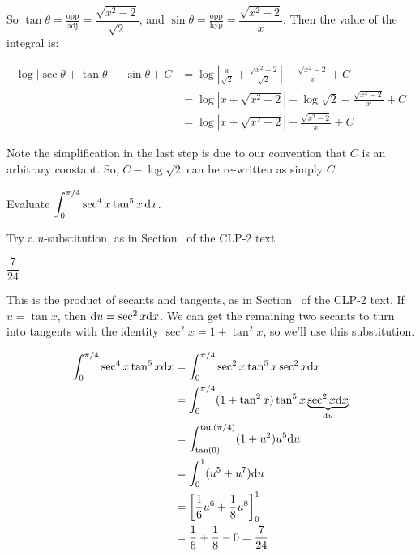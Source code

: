 \begin{solution}
\begin{center}
\end{center}

So $\tan \theta = \frac{\mbox{opp}}{\mbox{adj}}=\dfrac{\sqrt{x^2-2}}{\sqrt{2}}$, and $\sin\theta = \frac{\mbox{opp}}{\mbox{hyp}}=\dfrac{\sqrt{x^2-2}}{x}$. Then the value of the integral is:

\begin{align*}
\log|\sec\theta + \tan\theta|-\sin\theta +C
&={ \log \left|
\frac{x}{\sqrt{2}}+\frac{\sqrt{x^2-2}}{\sqrt{2}}
\right|-\frac{\sqrt{x^2-2}}{x}+C}\\
&={ \log \left| x+{\sqrt{x^2-2}}
\right|-\log\sqrt{2}-\frac{\sqrt{x^2-2}}{x}+C}\\
&= \log \left| x+{\sqrt{x^2-2}}
\right|-\frac{\sqrt{x^2-2}}{x}+C
\end{align*}

Note the simplification in the last step is due to our convention that $C$ is an arbitrary constant. So, $C-\log\sqrt{2}$ can be re-written as simply $C$.
\end{solution}




\begin{question} Evaluate
$\displaystyle\int_0^{\pi/4} \sec^4x\tan^5x\,\mathrm{d}x$.
\end{question}

\begin{hint}
Try a $u$-substitution, as in Section~ of the CLP-2 text%
\end{hint}

\begin{answer}
$\dfrac{7}{24}$
\end{answer}

\begin{solution}

This is the product of secants and tangents, as in Section~
of the CLP-2 text. %
 If $u=\tan x$, then $\mathrm{d}u=\sec^2x\mathrm{d}x$. We can get the remaining two secants to turn into tangents with the identity $\sec^2x=1+\tan^2x$, so we'll use this substitution.

\begin{align*}
\int_{0}^{\pi/4} \sec^4x\tan^5x\mathrm{d}x&=
\int_{0}^{\pi/4} \sec^2x\tan^5x\sec^2x\mathrm{d}x\\
&=
\int_{0}^{\pi/4} (1+\tan^2x)\tan^5x\underbrace{\sec^2x\mathrm{d}x}_{\mathrm{d}u}
\\
&=
\int_{\tan(0)}^{\tan(\pi/4)} (1+u^2)u^5\mathrm{d}u
\\
&=
\int_{0}^{1} (u^5+u^7)\mathrm{d}u
\\
&=
\left[\frac{1}{6}u^6+\frac{1}{8}u^8\right]_{0}^{1}
\\
&=\frac{1}{6}+\frac{1}{8}-0=\frac{7}{24}
\end{align*}
\end{solution}







